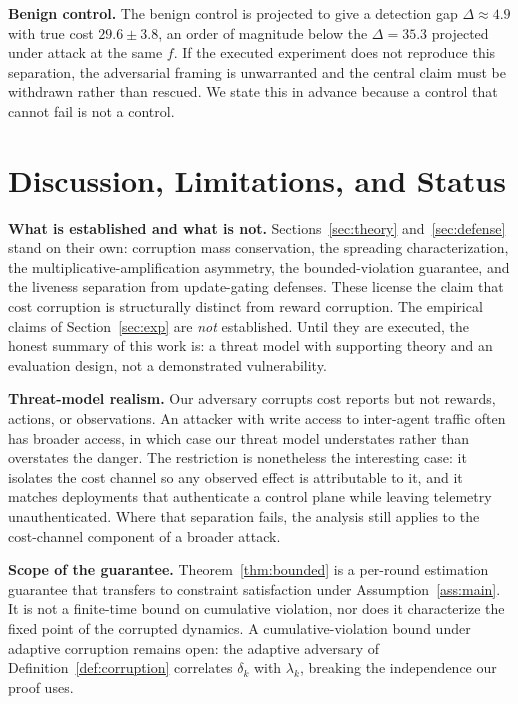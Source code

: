\documentclass{article}
\begin{document}
\textbf{Benign control.} The benign control is projected to give a detection gap $\Delta \approx 4.9$ with true cost $29.6 \pm 3.8$, an order of magnitude below the $\Delta = 35.3$ projected under attack at the same $f$. If the executed experiment does not reproduce this separation, the adversarial framing is unwarranted and the central claim must be withdrawn rather than rescued. We state this in advance because a control that cannot fail is not a control.

\section{Discussion, Limitations, and Status}
\label{sec:limitations}

\textbf{What is established and what is not.} Sections~\ref{sec:theory} and~\ref{sec:defense} stand on their own: corruption mass conservation, the spreading characterization, the multiplicative-amplification asymmetry, the bounded-violation guarantee, and the liveness separation from update-gating defenses. These license the claim that cost corruption is structurally distinct from reward corruption. The empirical claims of Section~\ref{sec:exp} are \emph{not} established. Until they are executed, the honest summary of this work is: a threat model with supporting theory and an evaluation design, not a demonstrated vulnerability.

\textbf{Threat-model realism.} Our adversary corrupts cost reports but not rewards, actions, or observations. An attacker with write access to inter-agent traffic often has broader access, in which case our threat model understates rather than overstates the danger. The restriction is nonetheless the interesting case: it isolates the cost channel so any observed effect is attributable to it, and it matches deployments that authenticate a control plane while leaving telemetry unauthenticated. Where that separation fails, the analysis still applies to the cost-channel component of a broader attack.

\textbf{Scope of the guarantee.} Theorem~\ref{thm:bounded} is a per-round estimation guarantee that transfers to constraint satisfaction under Assumption~\ref{ass:main}. It is not a finite-time bound on cumulative violation, nor does it characterize the fixed point of the corrupted dynamics. A cumulative-violation bound under adaptive corruption \citep{lykouris2024corruption} remains open: the adaptive adversary of Definition~\ref{def:corruption} correlates $\delta_k$ with $\lambda_k$, breaking the independence our proof uses.
\end{document}
